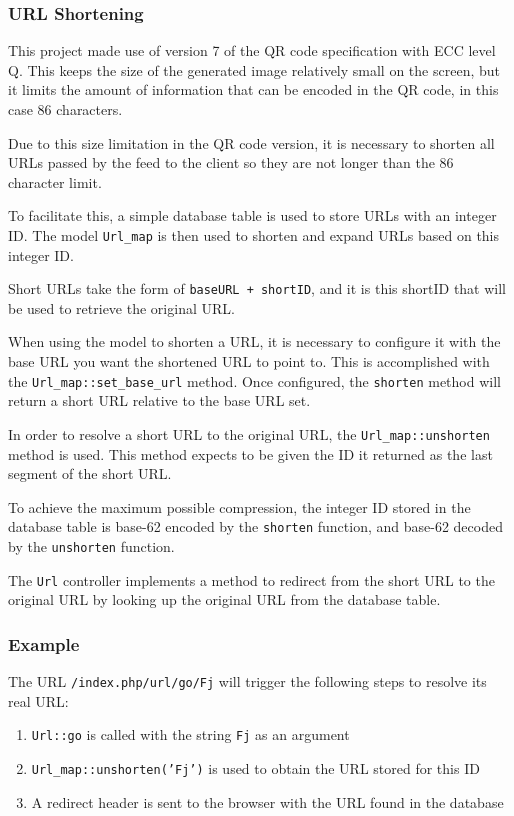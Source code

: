 \subsubsection{URL Shortening}
This project made use of version 7 of the QR code specification with ECC level Q. This keeps the size of the generated image relatively small on the screen, but it limits the amount of information that can be encoded in the QR code, in this case 86 characters.

Due to this size limitation in the QR code version, it is necessary to shorten all URLs passed by the feed to the client so they are not longer than the 86 character limit.

To facilitate this, a simple database table is used to store URLs with an integer ID. The model \texttt{Url\_map} is then used to shorten and expand URLs based on this integer ID.

Short URLs take the form of \texttt{baseURL + shortID}, and it is this shortID that will be used to retrieve the original URL.

When using the model to shorten a URL, it is necessary to configure it with the base URL you want the shortened URL to point to. This is accomplished with the \texttt{Url\_map::set\_base\_url} method. Once configured, the \texttt{shorten} method will return a short URL relative to the base URL set.

In order to resolve a short URL to the original URL, the \texttt{Url\_map::unshorten} method is used. This method expects to be given the ID it returned as the last segment of the short URL.

To achieve the maximum possible compression, the integer ID stored in the database table is base-62 encoded by the \texttt{shorten} function, and base-62 decoded by the \texttt{unshorten} function.

The \texttt{Url} controller implements a method to redirect from the short URL to the original URL by looking up the original URL from the database table.

\subsubsection*{Example}
The URL \texttt{/index.php/url/go/Fj} will trigger the following steps to resolve its real URL:

\begin{enumerate}
	\item \texttt{Url::go} is called with the string \texttt{Fj} as an argument
	\item \texttt{Url\_map::unshorten('Fj')} is used to obtain the URL stored for this ID
	\item A redirect header is sent to the browser with the URL found in the database
\end{enumerate}

